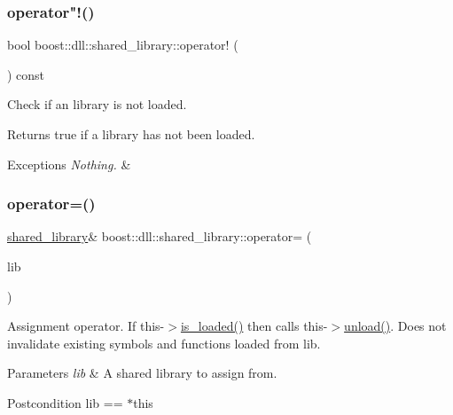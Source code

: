 \subsubsection{\texorpdfstring{operator"!()}{operator!()}}
{\footnotesize\ttfamily bool boost\+::dll\+::shared\+\_\+library\+::operator! (\begin{DoxyParamCaption}{ }\end{DoxyParamCaption}) const\hspace{0.3cm}{\ttfamily [inline]}}

Check if an library is not loaded.

\begin{DoxyReturn}{Returns}
true if a library has not been loaded. 
\end{DoxyReturn}

\begin{DoxyExceptions}{Exceptions}
{\em Nothing.} & \\
\hline
\end{DoxyExceptions}
\mbox{\label{a01708_a5f68b31fd48dcd4384cb4052af3a7df6}} 
\subsubsection{\texorpdfstring{operator=()}{operator=()}\hspace{0.1cm}{\footnotesize\ttfamily [1/2]}}
{\footnotesize\ttfamily \hyperlink{a01708}{shared\+\_\+library}\& boost\+::dll\+::shared\+\_\+library\+::operator= (\begin{DoxyParamCaption}\item[{B\+O\+O\+S\+T\+\_\+\+C\+O\+P\+Y\+\_\+\+A\+S\+S\+I\+G\+N\+\_\+\+R\+EF(\hyperlink{a01708}{shared\+\_\+library})}]{lib }\end{DoxyParamCaption})\hspace{0.3cm}{\ttfamily [inline]}}

Assignment operator. If this-\/$>$\hyperlink{a01708_a31ec32c213665bd151f2c615f89f94ef}{is\+\_\+loaded()} then calls this-\/$>$\hyperlink{a01708_a0c01ab046e5dcabe4c10db2a28cbe33e}{unload()}. Does not invalidate existing symbols and functions loaded from lib.


\begin{DoxyParams}{Parameters}
{\em lib} & A shared library to assign from. \\
\hline
\end{DoxyParams}
\begin{DoxyPostcond}{Postcondition}
lib == $\ast$this 
\end{DoxyPostcond}

